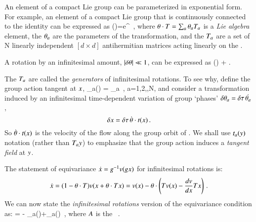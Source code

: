 An element of a compact Lie group can be parameterized in exponential form.
For example, an element of a compact Lie group that is continuously connected to the identity can be expressed as
\beq
\LieEl(\gSpace)=e^{{\gSpace} \cdot \Lg }
\,,
where $\gSpace \cdot \Lg = \sum_a \gSpace_a \Lg_a$ is a \emph{Lie algebra} element, the $\gSpace_a$ are the parameters of the transformation, and the $\Lg_a$ are a set of N linearly independent $[d\times d]$ antihermitian matrices acting linearly on the {\statesp}.
%

A rotation by an infinitesimal amount, $|\delta \gSpace| \ll 1$, can be  expressed as
\beq
\LieEl(\delta \gSpace)  + \delta \gSpace \cdot \Lg.

The $\Lg_a$  are called the \emph{generators} of infinitesimal rotations. To see why, define the group action tangent at $\ssp$,
\beq
 \groupTan_{a}(\ssp) = \Lg _{a} \ssp
    \,,\qquad
 a=1,2,\cdots,N,
and consider a transformation induced by an infinitesimal
time-dependent variation of group `phases'
$\delta \gSpace_a = \timeStep \, \dot{\gSpace_a}$,
\[
\delta \ssp = \timeStep \, \dot{\gSpace} \cdot \groupTan(\ssp)
\,.
\]
So $\dot{{\bf \theta}} \cdot t(x)$ is the velocity
of the flow along the group orbit of \ssp.
We shall use $t_a(y)$ notation (rather than
$T_{a}y$) to emphasize that the group action
induces a \emph{tangent field} at $y$.

The statement of equivariance
$
\dot{x}=g^{-1} v(g x)
$
for infinitesimal rotations is:
\[
\dot{x}=(1-{\bf \theta} \cdot T ) v(x+{\bf \theta} \cdot T  x)
       =v(x)-{\bf \theta} \cdot \left(
            T v(x) - \frac{dv}{dx} T x
                     \right)
\,.
\]
We can now state the {\em infinitesimal
rotations} version of the equivariance condition
 as:
 = - \groupTan_{a}(\vel)+\Mvar \groupTan_{a}(\ssp)
\,,
\label{eq:InfnmslRot}
\eeq
where $A$ is the \stabmat\ .

